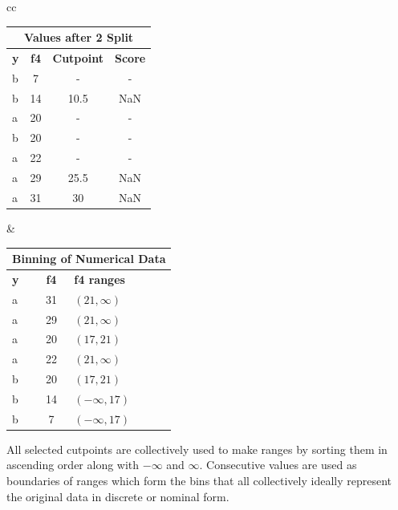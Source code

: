 \documentclass[pdflatex,sn-mathphys-num]{sn-jnl}%
\theoremstyle{thmstyleone}%
\theoremstyle{thmstyletwo}%
\theoremstyle{thmstylethree}%
\begin{document}
\begin{table}[ht!]
\begin{tabular}{cc}
    \begin{tabular}{|l|c|c|c|}
      \hline
      \multicolumn{4}{|c|}{Values after 2 Split} \\ \hline
      \textbf{y} & \textbf{f4} & \textbf{Cutpoint} & \textbf{Score} \\ \hline
      b          & 7           & -                 & -              \\
      b          & 14          & 10.5              & NaN            \\ \hline
      a          & 20          & -                 & -              \\
      b          & 20          & -                 & -              \\ \hline
      a          & 22          & -                 & -              \\
      a          & 29          & 25.5              & NaN            \\
      a          & 31          & 30                & NaN            \\ \hline
    \end{tabular}
      &
    \begin{tabular}{|l|c|l|}
      \hline
      \multicolumn{3}{|c|}{Binning of Numerical Data} \\ \hline
      \textbf{y} & \textbf{f4} & \textbf{f4 ranges} \\ \hline
      a          & 31          & \((21, \infty)\)   \\
      a          & 29          & \((21, \infty)\)   \\
      a          & 20          & \((17, 21)\)       \\
      a          & 22          & \((21, \infty)\)   \\
      b          & 20          & \((17, 21)\)       \\
      b          & 14          & \((-\infty, 17)\)  \\
      b          & 7           & \((-\infty, 17)\)  \\ \hline
    \end{tabular}
  \end{tabular}
\end{table}


All selected cutpoints are collectively used to make ranges by sorting them in ascending order along with \(-\infty\) and \(\infty\).
Consecutive values are used as boundaries of ranges which form the bins that all collectively ideally represent the original data in discrete or nominal form.
\end{document}
